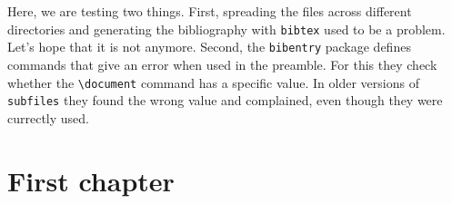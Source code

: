 \documentclass{report}
\begin{document}
Here, we are testing two things. First, spreading the files across
different directories and generating the bibliography with
\verb|bibtex| used to be a problem. Let's hope that it is not anymore.
Second, the \verb|bibentry| package defines commands that give an
error when used in the preamble. For this they check whether the
\verb|\document| command has a specific value. In older versions of
\verb|subfiles| they found the wrong value and complained, even though
they were currectly used.

\chapter{First chapter}

\end{document}

